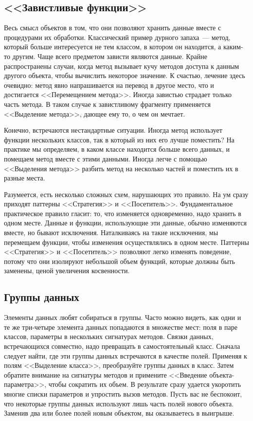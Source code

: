 \documentclass{../../text-style}
\begin{document}
\subsection{<<Завистливые функции>>}

Весь смысл объектов в том, что они позволяют хранить данные вместе с процедурами их обработки. Классический пример дурного запаха~--- метод, который больше интересуется не тем классом, в котором он находится, а каким-то другим. Чаще всего предметом зависти являются данные. Крайне распространены случаи, когда метод вызывает кучу методов доступа к данным другого объекта, чтобы вычислить некоторое значение. К счастью, лечение здесь очевидно: метод явно напрашивается на перевод в другое место, что и достигается <<Перемещением метода>>. Иногда завистью страдает только часть метода. В таком случае к завистливому фрагменту применяется <<Выделение метода>>, дающее ему то, о чем он мечтает.

Конечно, встречаются нестандартные ситуации. Иногда метод использует функции нескольких классов, так в который из них его лучше поместить? На практике мы определяем, в каком классе находится больше всего данных, и помещаем метод вместе с этими данными. Иногда легче с помощью <<Выделения метода>> разбить метод на несколько частей и поместить их в разные места.

Разумеется, есть несколько сложных схем, нарушающих это правило. На ум сразу приходят паттерны <<Стратегия>> и <<Посетитель>>. Фундаментальное практическое правило гласит: то, что изменяется одновременно, надо хранить в одном месте. Данные и функции, использующие эти данные, обычно изменяются вместе, но бывают исключения. Наталкиваясь на такие исключения, мы перемещаем функции, чтобы изменения осуществлялись в одном месте. Паттерны <<Стратегия>> и <<Посетитель>> позволяют легко изменять поведение, потому что они изолируют небольшой объем функций, которые должны быть заменены, ценой увеличения косвенности.

\subsection{Группы данных}

Элементы данных любят собираться в группы. Часто можно видеть, как одни и те же три-четыре элемента данных попадаются в множестве мест: поля в паре классов, параметры в нескольких сигнатурах методов. Связки данных, встречающихся совместно, надо превращать в самостоятельный класс. Сначала следует найти, где эти группы данных встречаются в качестве полей. Применяя к полям <<Выделение класса>>, преобразуйте группы данных в класс. Затем обратите внимание на сигнатуры методов и примените <<Введение объекта-параметра>>, чтобы сократить их объем. В результате сразу удается укоротить многие списки параметров и упростить вызов методов. Пусть вас не беспокоит, что некоторые группы данных используют лишь часть полей нового объекта. Заменив два или более полей новым объектом, вы оказываетесь в выигрыше.
\end{document}
